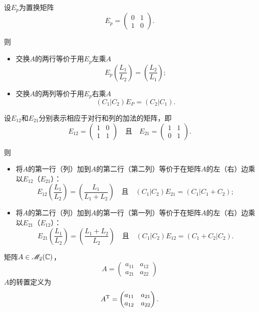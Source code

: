   设$E_p$为{\kaishu 置换矩阵}
  \[
    E_p = \begin{pmatrix}
      0 & 1 \\
      1 & 0
    \end{pmatrix}.
  \]

  则
  \begin{mybox}
    \begin{itemize}
      \item 交换$A$的两行等价于用$E_p$左乘$A$
      \[
        E_p \left( \frac{L_1}{L_2} \right)
        = \left( \frac{L_2}{L_1} \right);
      \]
      \item 交换$A$的两列等价于用$E_p$右乘$A$
      \[
        (C_1|C_2)E_P = (C_2|C_1).
      \]
    \end{itemize}
  \end{mybox}

  设$E_{12}$和$E_{21}$分别表示相应于对行和列的加法的矩阵，即
  \[
    E_{12} = \begin{pmatrix}
      1 & 0 \\
      1 & 1
    \end{pmatrix}\quad \text{且}\quad E_{21} =
    \begin{pmatrix}
      1 & 1 \\
      0 & 1
    \end{pmatrix}.
  \]

  则
  \begin{mybox}
    \begin{itemize}
      \item 将$A$的第一行（列）加到$A$的第二行（第二列）等价于在矩阵$A$的左（右）边乘以$E_{12}$（$E_{21}$）：
          \[
            E_{12} \left( \frac{L_1}{L_2} \right)
            = \left( \frac{L_1}{L_1+L_2} \right)
            \quad \text{且}\quad
            (C_1|C_2)E_{21} = (C_1|C_1 + C_2);
          \]
      \item 将$A$的第二行（列）加到$A$的第一行（第一列）等价于在矩阵$A$的左（右）边乘以$E_{21}$（$E_{12}$）：
          \[
            E_{21} \left( \frac{L_1}{L_2} \right)
            = \left( \frac{L_1+L_2}{L_2} \right)
            \quad \text{且}\quad
            (C_1|C_2)E_{12} = (C_1 + C_2|C_2).
          \]
    \end{itemize}
  \end{mybox}

  \begin{definition}
    矩阵$A\in\mathscr M_2(\mathbb C)$，
    \[
      A = \begin{pmatrix}
        a_{11} & a_{12} \\
        a_{21} & a_{22}
      \end{pmatrix}
    \]
    $A$的{\kaishu 转置}定义为
    \[
      A^{\mathrm T} = \begin{pmatrix}
        a_{11} & a_{21} \\
        a_{12} & a_{22}
      \end{pmatrix}.
    \]
  \end{definition}

